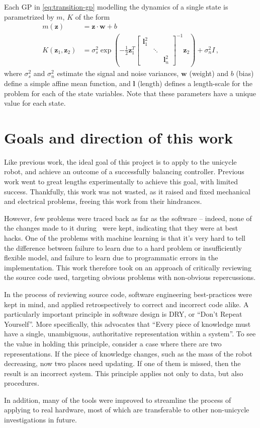 \documentclass[main.tex]{subfiles}
\begin{document}
		Each GP in \cref{eq:transition-gp} modelling the dynamics of a single state is parametrized by $m$, $K$ of the form
		\begin{align}
			m(\bm{z}) &= \bm{z} \cdot \bm{w} + b \\
			K(\bm{z}_1, \bm{z}_2) &= \sigma_s^2 \exp \left(
				-\frac{1}{2}
				\bm{z}_1^T
				\begin{bmatrix}
					\bm{l}_1^2 && \\
					& \ddots & \\
					&& \bm{l}_n^2
				\end{bmatrix}^{-1}
				\bm{z}_2
			\right) + \sigma_n^2 I \,,
		\end{align}
		where $\sigma_s^2$ and $\sigma_n^2$ estimate the signal and noise variances, $\bm{w}$ (weight) and $b$ (bias) define a simple affine mean function, and $\bm{l}$ (length) defines a length-scale for the problem for each of the state variables.
		Note that these parameters have a unique value for each state.

\section{Goals and direction of this work}
	\label{sec:dry}

	Like previous work, the ideal goal of this project is to apply {\Pilco} to the unicycle robot, and achieve an outcome of a successfully balancing controller.
	Previous work went to great lengths experimentally to achieve this goal, with limited success. Thankfully, this work was not wasted, as it raised and fixed mechanical and electrical problems, freeing this work from their hindrances.

	However, few problems were traced back as far as the {\Pilco} software -- indeed, none of the changes made to it during~\cite{aleksi} were kept, indicating that they were at best hacks.
	One of the problems with machine learning is that it's very hard to tell the difference between failure to learn due to a hard problem or insufficiently flexible model, and failure to learn due to programmatic errors in the implementation.
	This work therefore took on an approach of critically reviewing the source code used, targeting obvious problems with non-obvious repercussions.

	In the process of reviewing source code, software engineering best-practices were kept in mind, and applied retrospectively to correct and incorrect code alike.
	A particularly important principle in software design is DRY, or \enquote{Don't Repeat Yourself}.
	More specifically, this advocates that \enquote{Every piece of knowledge must have a single, unambiguous, authoritative representation within a system}\cite{dry}.
	To see the value in holding this principle, consider a case where there are two representations. If the piece of knowledge changes, such as the mass of the robot decreasing, now two places need updating. If one of them is missed, then the result is an incorrect system. This principle applies not only to data, but also procedures.

	In addition, many of the tools were improved to streamline the process of applying {\Pilco} to real hardware, most of which are transferable to other non-unicycle investigations in future.


\bib
\end{document}
